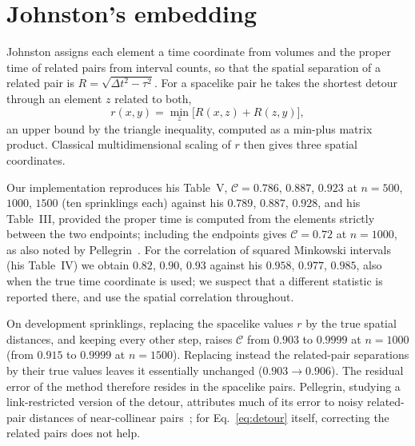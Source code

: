 \documentclass[prd,twocolumn,superscriptaddress,nofootinbib,amsmath,amssymb,floatfix]{revtex4-2}
\begin{document}
\section{Johnston's embedding}\label{sec:johnston}
Johnston assigns each element a time coordinate from volumes and the proper time of related pairs from interval counts, so that the spatial separation of a related pair is $R=\sqrt{\Delta t^2-\tau^2}$. For a spacelike pair he takes the shortest detour through an element $z$ related to both,
\begin{equation}
r(x,y)=\min_z\big[R(x,z)+R(z,y)\big],
\label{eq:detour}
\end{equation}
an upper bound by the triangle inequality, computed as a min-plus matrix product. Classical multidimensional scaling of $r$ then gives three spatial coordinates.

Our implementation reproduces his Table~V, $\mathcal C=0.786$, $0.887$, $0.923$ at $n=500$, $1000$, $1500$ (ten sprinklings each) against his $0.789$, $0.887$, $0.928$, and his Table~III, provided the proper time is computed from the elements strictly between the two endpoints; including the endpoints gives $\mathcal C=0.72$ at $n=1000$, as also noted by Pellegrin~\cite{Pellegrin26}. For the correlation of squared Minkowski intervals (his Table~IV) we obtain $0.82$, $0.90$, $0.93$ against his $0.958$, $0.977$, $0.985$, also when the true time coordinate is used; we suspect that a different statistic is reported there, and use the spatial correlation throughout.

On development sprinklings, replacing the spacelike values $r$ by the true spatial distances, and keeping every other step, raises $\mathcal C$ from $0.903$ to $0.9999$ at $n=1000$ (from $0.915$ to $0.9999$ at $n=1500$). Replacing instead the related-pair separations by their true values leaves it essentially unchanged ($0.903\to0.906$). The residual error of the method therefore resides in the spacelike pairs. Pellegrin, studying a link-restricted version of the detour, attributes much of its error to noisy related-pair distances of near-collinear pairs~\cite{Pellegrin26}; for Eq.~\eqref{eq:detour} itself, correcting the related pairs does not help.
\end{document}
